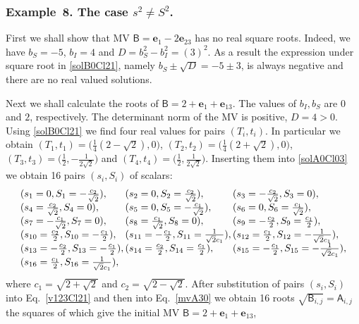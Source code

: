 \documentclass{birkjour}
\newcommand{\e}[1]{\mathbf{e}_{#1}} %
\def\A{\mathsf{A}}
\def\B{\mathsf{B}}
\def\e#1{\mathbf{e}_{#1}} %
\begin{document}
\subsubsection*{Example~8. The case $s^2\neq S^2$.}
First we shall show  that MV  $\B=\e{1}-2 \e{23}$  has no real
square roots. Indeed, we have  $b_S=-5$,  $b_I=4$ and
$D=b_S^2-b_I^2=(3)^2$. As a result  the expression under square
root in \eqref{solB0Cl21}, namely $b_S\pm\sqrt{D}=-5\pm3$, is
always negative and there are no real valued solutions.

Next we shall calculate the roots of $\B=2+\e{1}+\e{13}$. The
values of $b_I, b_S$ are $0$ and $2$, respectively. The
determinant norm of the MV is positive, $D=4>0$. Using
\eqref{solB0Cl21} we find four real values for pairs $(T_i,t_i)$.
In particular we obtain
 $ (T_1,t_1)=\bigl(\frac{1}{4} (2-\sqrt{2}) , 0\bigr)$, $(T_2,t_2)=\bigl(\frac{1}{4} (2+\sqrt{2}) , 0\bigr)$, $(T_3,t_3)=\bigl(\frac{1}{2} , -\frac{1}{2 \sqrt{2}}\bigr)$ and $(T_4,t_4)=  \bigl(\frac{1}{2} , \frac{1}{2 \sqrt{2}}\bigr)$.
Inserting them into \eqref{solA0Cl03} we obtain 16 pairs
$(s_i,S_i)$ of scalars:
\[ \begin{array}{lll}
 (s_1= 0,S_1=-\frac{c_2}{\sqrt{2}}),
  &\mspace{-15mu}(s_2= 0,S_2=\frac{c_2}{\sqrt{2}}),
  &\mspace{-15mu}(s_3= -\frac{c_2}{\sqrt{2}},S_3= 0),\\
  (s_4= \frac{c_2}{\sqrt{2}},S_4= 0),
  &\mspace{-15mu}(s_5= 0,S_5= -\frac{c_1}{\sqrt{2}}),
  &\mspace{-15mu}(s_6= 0,S_6= \frac{c_1}{\sqrt{2}}),\\
  (s_7= -\frac{c_1}{\sqrt{2}},S_7= 0),
  &\mspace{-15mu}(s_8= \frac{c_1}{\sqrt{2}},S_8= 0),
  &\mspace{-15mu}(s_9= -\frac{c_2}{2},S_9= \frac{c_1}{2}),\\
  (s_{10}= \frac{c_2}{2},S_{10}= -\frac{c_1}{2}),
  &\mspace{-15mu}(s_{11}= -\frac{c_1}{2},S_{11}= \frac{1}{\sqrt{2} c_1}),
  &\mspace{-15mu}(s_{12}= \frac{c_1}{2},S_{12}= -\frac{1}{\sqrt{2} c_1}),\\
  (s_{13}= -\frac{c_2}{2},S_{13}= -\frac{c_1}{2}),
  &\mspace{-15mu}(s_{14}= \frac{c_2}{2},S_{14}= \frac{c_1}{2}),
  &\mspace{-15mu}(s_{15}= -\frac{c_1}{2},S_{15}= -\frac{1}{\sqrt{2} c_1}),\\
  (s_{16}= \frac{c_1}{2},S_{16}=\frac{1}{\sqrt{2} c_1}), & &
  \end{array}\]
where $c_1=\sqrt{2+\sqrt{2}}$ and $c_2=\sqrt{2-\sqrt{2}}$. After
substitution of pairs $(s_i,S_i)$ into Eq.~\eqref{v123Cl21} and
then into Eq.~\eqref{mvA30} we obtain 16  roots
$\sqrt{\B_{i,j}}=\A_{i,j}$ the squares of which give the initial
MV $\B=2+\e{1}+\e{13}$,
\end{document}
